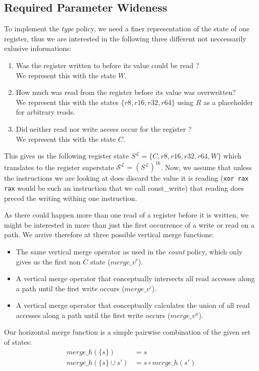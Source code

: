 \subsection{Required Parameter Wideness}
\label{subsection:requiredparamwideness}
To implement the \emph{type} policy, we need a finer representation of the state of one register, thus we are interested in the following three different not neccessarily exlusive informations:
\begin{enumerate}
\item Was the register written to before its value could be read ? \\ We represent this with the state $W$.
\item How much was read from the register before its value was overwritten? \\ We represent this with the states $\{ r8, r16, r32, r64 \}$ using $R$ as a placeholder for arbitrary reads.
\item Did neither read nor write access occur for the register ? \\ We represent this with the state $C$.
\end{enumerate}
This gives us the following register state $S^\mathcal{L} = \{ C, r8, r16, r32, r64, W \}$ which translates to the register superstate $\mathcal{S}^\mathcal{L} = (S^\mathcal{L})^{16}$.
Now, we assume that unless the instructions we are looking at does discard the value it is reading (\texttt{xor rax rax} would be such an instruction that we call const\_write) that reading does preced the writing withing one instruction.

As there could happen more than one read of a register before it is written, we might be interested in more than just the first occurrence of a write or read on a path. We arrive therefore at three possible vertical merge functions:
\begin{itemize}
	\item The same vertical merge operator as used in the \emph{count} policy, which only gives us the first non $C$ state ($merge\_v^{r}$).
	\item A vertical merge operator that conceptually intersects all read accesses along a path until the first write occurs ($merge\_v^{i}$).
	\item A vertical merge operator that conceptually calculates the union of all read accesses along a path until the first write occurs ($merge\_v^{u}$).
\end{itemize}

Our horizontal merge function is a simple pairwise combination of the given set of states:
\begin{align}
merge\_h(\{s\}) &= s\\
merge\_h(\{s\} \cup s') &= s \circ merge\_h(s')
\end{align}

